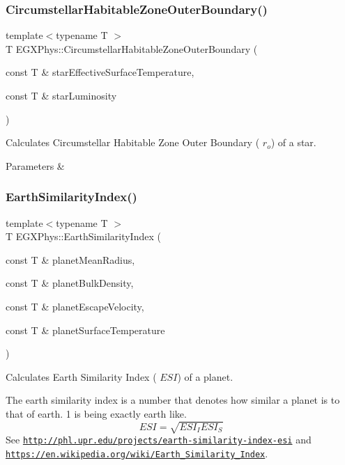 \subsubsection{\texorpdfstring{Circumstellar\+Habitable\+Zone\+Outer\+Boundary()}{CircumstellarHabitableZoneOuterBoundary()}}
{\footnotesize\ttfamily template$<$typename T $>$ \\
T E\+G\+X\+Phys\+::\+Circumstellar\+Habitable\+Zone\+Outer\+Boundary (\begin{DoxyParamCaption}\item[{const T \&}]{star\+Effective\+Surface\+Temperature,  }\item[{const T \&}]{star\+Luminosity }\end{DoxyParamCaption})}



Calculates Circumstellar Habitable Zone Outer Boundary ( $r_o$) of a star. 


\begin{DoxyParams}{Parameters}
{\em } & \\
\hline
\end{DoxyParams}
\mbox{\label{group___astrophysics_ga4b86397b1c839c49ac599d49fda207d4}} 
\subsubsection{\texorpdfstring{Earth\+Similarity\+Index()}{EarthSimilarityIndex()}}
{\footnotesize\ttfamily template$<$typename T $>$ \\
T E\+G\+X\+Phys\+::\+Earth\+Similarity\+Index (\begin{DoxyParamCaption}\item[{const T \&}]{planet\+Mean\+Radius,  }\item[{const T \&}]{planet\+Bulk\+Density,  }\item[{const T \&}]{planet\+Escape\+Velocity,  }\item[{const T \&}]{planet\+Surface\+Temperature }\end{DoxyParamCaption})}



Calculates Earth Similarity Index ( $ESI$) of a planet. 

The earth similarity index is a number that denotes how similar a planet is to that of earth. 1 is being exactly earth like. \[ESI=\sqrt{ESI_I ESI_S}\] See \href{http://phl.upr.edu/projects/earth-similarity-index-esi}{\tt http\+://phl.\+upr.\+edu/projects/earth-\/similarity-\/index-\/esi} and \href{https://en.wikipedia.org/wiki/Earth_Similarity_Index}{\tt https\+://en.\+wikipedia.\+org/wiki/\+Earth\+\_\+\+Similarity\+\_\+\+Index}.

